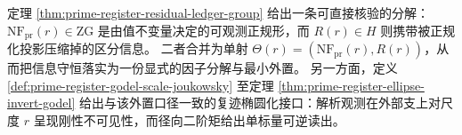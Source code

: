 

\begin{remark}[可观测正规形与外置账本的分解接口]\label{rem:prime-register-observable-vs-ledger}
定理 \ref{thm:prime-register-residual-ledger-group} 给出一条可直接核验的分解：\(\mathrm{NF}_{\mathrm{pr}}(r)\in\mathrm{ZG}\) 是由值不变量决定的可观测正规形，而 \(R(r)\in H\) 则携带被正规化投影压缩掉的区分信息。
二者合并为单射 \(\Theta(r)=(\mathrm{NF}_{\mathrm{pr}}(r),R(r))\)，从而把信息守恒落实为一份显式的因子分解与最小外置。
另一方面，定义 \ref{def:prime-register-godel-scale-joukowsky} 至定理 \ref{thm:prime-register-ellipse-invert-godel} 给出与该外置口径一致的复迹椭圆化接口：解析观测在外部支上对尺度 \(r\) 呈现刚性不可见性，而径向二阶矩给出单标量可逆读出。
\end{remark}



